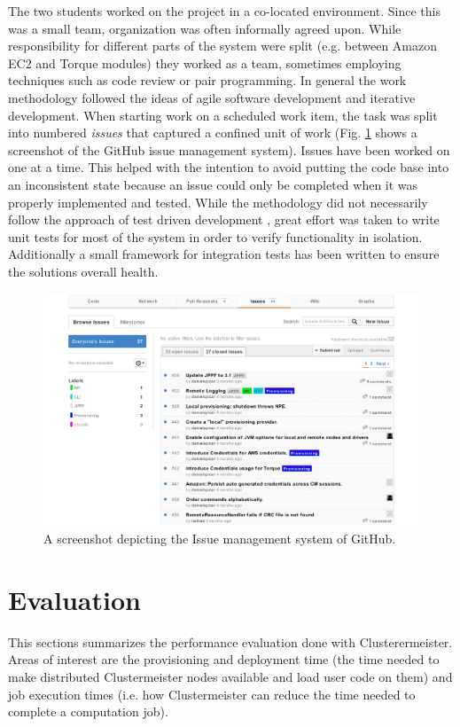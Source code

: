 \documentclass[english]{uzhpub}
\begin{document}
The two students worked on the project in a co-located environment. Since this was a small team, organization was often informally agreed upon. While responsibility for different parts of the system were split (e.g. between Amazon EC2 and Torque modules) they worked as a team, sometimes employing techniques such as code review or pair programming. In general the work methodology followed the ideas of agile software development \cite{agile-wiki} and iterative development. When starting work on a scheduled work item, the task was split into numbered \emph{issues} that captured a confined unit of work (Fig. \ref{fig:issues} shows a screenshot of the GitHub issue management system). Issues have been worked on one at a time. This helped with the intention to avoid putting the code base into an inconsistent state because an issue could only be completed when it was properly implemented and tested. While the methodology did not necessarily follow the approach of test driven development \cite{tdd}, great effort was taken to write unit tests for most of the system in order 
to verify functionality in isolation. Additionally a small framework for integration tests has been written to ensure the solutions overall health.

\begin{figure}[hptb]
\centering
\includegraphics[scale=0.7]{images/github-issues.pdf}
\caption{A screenshot depicting the Issue management system of GitHub.}
\label{fig:issues}
\end{figure}

\section{Evaluation}
This sections summarizes the performance evaluation done with Clusterermeister. Areas of interest are the provisioning and deployment time (the time needed to make distributed Clustermeister nodes available and load user code on them) and job execution times (i.e. how Clustermeister can reduce the time needed to complete a computation job). 
\end{document}

